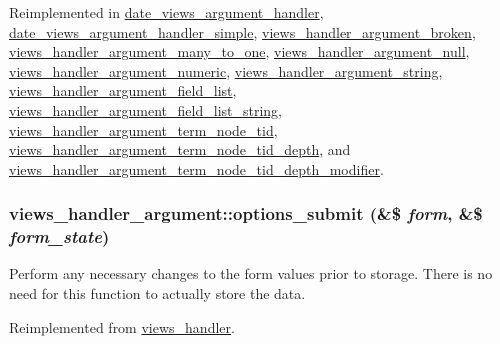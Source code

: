 Reimplemented in \hyperlink{classdate__views__argument__handler_a590b98bc076d465f778862b82c76f6e5}{date\_\-views\_\-argument\_\-handler}, \hyperlink{classdate__views__argument__handler__simple_a5e0544a2cc996a45bca1ff1982da9fbc}{date\_\-views\_\-argument\_\-handler\_\-simple}, \hyperlink{classviews__handler__argument__broken_adc6789177dec1350859832bc7b242454}{views\_\-handler\_\-argument\_\-broken}, \hyperlink{classviews__handler__argument__many__to__one_add3ed7d59f17d79f48ef8f47e049cb92}{views\_\-handler\_\-argument\_\-many\_\-to\_\-one}, \hyperlink{classviews__handler__argument__null_a414f383de12d08f6e1e5eccb572cf9c8}{views\_\-handler\_\-argument\_\-null}, \hyperlink{classviews__handler__argument__numeric_ab30359963ec4962258bb8db3b6a870c4}{views\_\-handler\_\-argument\_\-numeric}, \hyperlink{classviews__handler__argument__string_ab96e2120f4f4458921f817b343d11ef0}{views\_\-handler\_\-argument\_\-string}, \hyperlink{classviews__handler__argument__field__list_a8fd9b838e00ade74124ff96dbfce439c}{views\_\-handler\_\-argument\_\-field\_\-list}, \hyperlink{classviews__handler__argument__field__list__string_a4e4a9d1fc93be565b57059152d21ae03}{views\_\-handler\_\-argument\_\-field\_\-list\_\-string}, \hyperlink{classviews__handler__argument__term__node__tid_af00552a1378333434154989c051d0e98}{views\_\-handler\_\-argument\_\-term\_\-node\_\-tid}, \hyperlink{classviews__handler__argument__term__node__tid__depth_adb15b091303182e330a162d384676e50}{views\_\-handler\_\-argument\_\-term\_\-node\_\-tid\_\-depth}, and \hyperlink{classviews__handler__argument__term__node__tid__depth__modifier_aa4796e763923377f41dbf9bf415d96e8}{views\_\-handler\_\-argument\_\-term\_\-node\_\-tid\_\-depth\_\-modifier}.\hypertarget{classviews__handler__argument_ad9c8c040a47bd9910dbce31e8932b882}{
\subsubsection[{options\_\-submit}]{\setlength{\rightskip}{0pt plus 5cm}views\_\-handler\_\-argument::options\_\-submit (\&\$ {\em form}, \/  \&\$ {\em form\_\-state})}}
\label{classviews__handler__argument_ad9c8c040a47bd9910dbce31e8932b882}
Perform any necessary changes to the form values prior to storage. There is no need for this function to actually store the data. 

Reimplemented from \hyperlink{classviews__handler_abb55e97dbb1e634b95a1cc9ea836d6e8}{views\_\-handler}.

